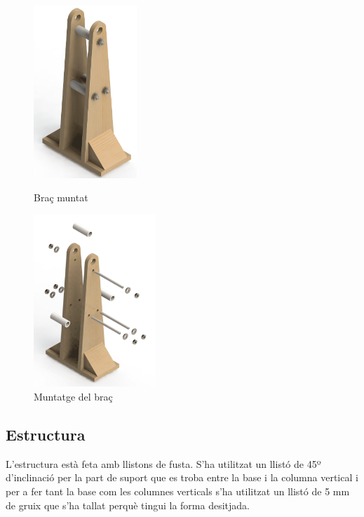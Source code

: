 \documentclass[a4paper, 12pt]{article}
\begin{document}
\begin{figure}[h!]
\begin{minipage}[b]{0.45\linewidth}
\centering
\includegraphics[height=6.5cm]{./imgComp/brac}
\caption{Braç muntat}
\end{minipage}
\begin{minipage}[b]{0.45\linewidth}
\centering
\includegraphics[height=6.5cm]{./imgComp/brac_expl}
\caption{Muntatge del braç}
\end{minipage}
\end{figure}

\subsection{Estructura}
L'estructura està feta amb llistons de fusta. S'ha utilitzat un llistó de 45º d'inclinació per la part de suport que es troba entre la base i la columna vertical i per a fer tant la base com les columnes verticals s'ha utilitzat un llistó de 5 mm de gruix que s'ha tallat perquè tingui la forma desitjada. 
\end{document}
